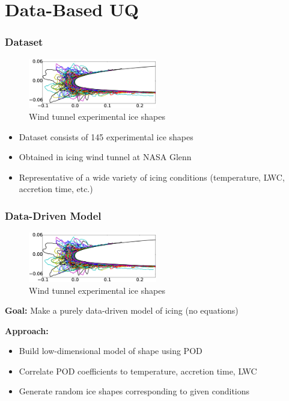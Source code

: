 \documentclass[9pt]{beamer}
\begin{document}
\section{Data-Based UQ}
\label{sec-2}
\begin{frame}
\frametitle{Dataset}
\label{sec-2-1}

\vspace*{-0.0cm}\begin{figure}
      \includegraphics[width=0.5\textwidth]{GlobalDataSet}
      \caption{Wind tunnel experimental ice shapes}
\end{figure}
\begin{itemize}
\item Dataset consists of 145 experimental ice shapes
\item Obtained in icing wind tunnel at NASA Glenn\footnotemark[1]
\item Representative of a wide variety of icing conditions (temperature,
  LWC, accretion time, etc.)
\end{itemize}
  
\end{frame}
\begin{frame}
\frametitle{Data-Driven Model}
\label{sec-2-2}

\vspace*{-0.0cm}\begin{figure}
      \includegraphics[width=0.5\textwidth]{GlobalDataSet}
      \caption{Wind tunnel experimental ice shapes}
\end{figure}
\textbf{Goal:} Make a purely data-driven model of icing (no equations)

\textbf{Approach:}
\begin{itemize}
\item Build low-dimensional model of shape using POD
\item Correlate POD coefficients to temperature, accretion time, LWC
\item Generate random ice shapes corresponding to given conditions
\end{itemize}
\end{frame}
\end{document}
